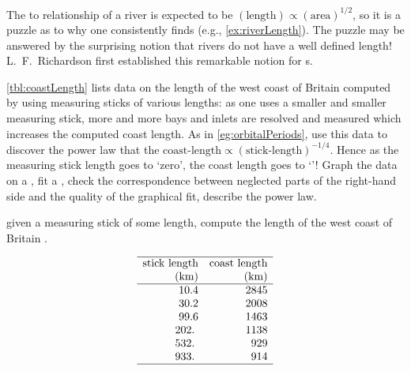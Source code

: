 \begin{exercise} \label{ex:coastlength} 
The  to  relationship of a river is expected to be \((\text{length})\propto(\text{area})^{1/2}\), so it is a puzzle as to why one consistently finds  (e.g., \autoref{ex:riverLength}).
The puzzle may be answered by the surprising notion that rivers do not have a well defined length!
L.~F.~Richardson first established this remarkable notion for s.

\autoref{tbl:coastLength} lists data on the length of the west coast of Britain computed by using measuring sticks of various lengths: as one uses a smaller and smaller measuring stick, more and more bays and inlets are resolved and measured which increases the computed coast length. 
\setbox\ajrqrbox\hbox{}%
\marginajrbox%
As in \autoref{eg:orbitalPeriods}, use this data to discover the power law that the \(\text{coast-length}\propto(\text{stick-length})^{-1/4}\).
Hence as the measuring stick length goes to `zero', the coast length goes to `'!  
Graph the data on a , fit a , check the correspondence between neglected parts of the right-hand side and the quality of the graphical fit, describe the power law.
\begin{table}
\caption{given a measuring stick of some length, compute the length of the west coast of Britain \cite[Plate~33]{Mandelbrot1982}.}
\label{tbl:coastLength}
\begin{equation*}
\begin{array}{rr} \hline
\text{stick length}&\text{coast length}\\
(\text{km})&\text{(km)}\\\hline
     10.4 & 2845 \\
     30.2 & 2008 \\
     99.6 & 1463 \\
    202.\ & 1138 \\
    532.\ &  929 \\
    933.\ &  914 \\
\hline
\end{array}
\end{equation*}
\end{table}%
\end{exercise}




